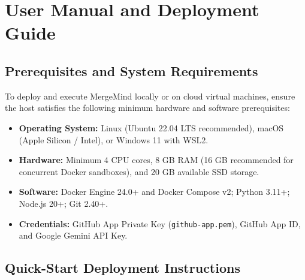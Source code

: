 \chapter{User Manual and Deployment Guide}
\label{app:user-manual}

\section{Prerequisites and System Requirements}

To deploy and execute MergeMind locally or on cloud virtual machines, ensure the host satisfies the following minimum hardware and software prerequisites:

\begin{itemize}
    \item \textbf{Operating System:} Linux (Ubuntu 22.04 LTS recommended), macOS (Apple Silicon / Intel), or Windows 11 with WSL2.
    \item \textbf{Hardware:} Minimum 4 CPU cores, 8 GB RAM (16 GB recommended for concurrent Docker sandboxes), and 20 GB available SSD storage.
    \item \textbf{Software:} Docker Engine 24.0+ and Docker Compose v2; Python 3.11+; Node.js 20+; Git 2.40+.
    \item \textbf{Credentials:} GitHub App Private Key (\texttt{github-app.pem}), GitHub App ID, and Google Gemini API Key.
\end{itemize}

\section{Quick-Start Deployment Instructions}

